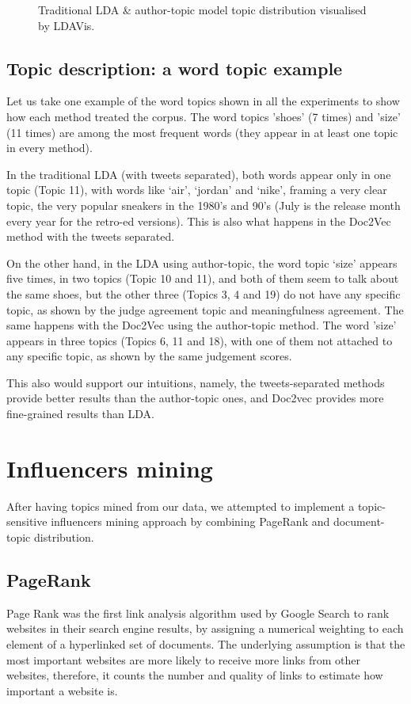 \documentclass[11pt]{article}
\begin{document}
\begin{figure}[H]
    \caption{Traditional LDA \& author-topic model topic distribution visualised by LDAVis.}
    \label{fig:res_trad_var}
\end{figure}

\subsection{Topic description: a word topic example}

Let us take one example of the word topics shown in all the experiments to show how each method treated the corpus. The word topics 'shoes' (7 times) and 'size' (11 times) are among the most frequent words (they appear in at least one topic in every method).  

In the traditional LDA (with tweets separated), both words appear only in one topic (Topic 11), with words like `air', `jordan' and `nike', framing a very clear topic, the very popular sneakers in the 1980's and 90's (July is the release month every year for the retro-ed versions). This is also what happens in the Doc2Vec method with the tweets separated.  

On the other hand, in the LDA using author-topic, the word topic `size' appears five times, in two topics (Topic 10 and 11), and both of them seem to talk about the same shoes, but the other three (Topics 3, 4 and 19) do not have any specific topic, as shown by the judge agreement topic and meaningfulness agreement. The same happens with the Doc2Vec using the author-topic method. The word 'size' appears in three topics (Topics 6, 11 and 18), with one of them not attached to any specific topic, as shown by the same judgement scores.

This also would support our intuitions, namely, the tweets-separated methods provide better results than the author-topic ones, and Doc2vec provides more fine-grained results than LDA. 

\section{Influencers mining}

After having topics mined from our data, we attempted to implement a topic-sensitive influencers mining approach by combining PageRank and document-topic distribution.

\subsection{PageRank}
Page Rank was the first link analysis algorithm used by Google Search to rank websites in their search engine results, by assigning a numerical weighting to each element of a hyperlinked set of documents. The underlying assumption is that the most important websites are more likely to receive more links from other websites, therefore, it counts the number and quality of links to estimate how important a website is.
\end{document}
